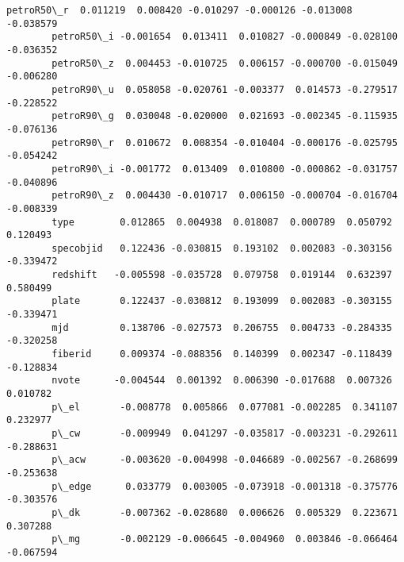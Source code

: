 \documentclass[11pt]{article}
\begin{document}
\begin{Verbatim}[commandchars=\\\{\}]
        petroR50\_r  0.011219  0.008420 -0.010297 -0.000126 -0.013008 -0.038579   
        petroR50\_i -0.001654  0.013411  0.010827 -0.000849 -0.028100 -0.036352   
        petroR50\_z  0.004453 -0.010725  0.006157 -0.000700 -0.015049 -0.006280   
        petroR90\_u  0.058058 -0.020761 -0.003377  0.014573 -0.279517 -0.228522   
        petroR90\_g  0.030048 -0.020000  0.021693 -0.002345 -0.115935 -0.076136   
        petroR90\_r  0.010672  0.008354 -0.010404 -0.000176 -0.025795 -0.054242   
        petroR90\_i -0.001772  0.013409  0.010800 -0.000862 -0.031757 -0.040896   
        petroR90\_z  0.004430 -0.010717  0.006150 -0.000704 -0.016704 -0.008339   
        type        0.012865  0.004938  0.018087  0.000789  0.050792  0.120493   
        specobjid   0.122436 -0.030815  0.193102  0.002083 -0.303156 -0.339472   
        redshift   -0.005598 -0.035728  0.079758  0.019144  0.632397  0.580499   
        plate       0.122437 -0.030812  0.193099  0.002083 -0.303155 -0.339471   
        mjd         0.138706 -0.027573  0.206755  0.004733 -0.284335 -0.320258   
        fiberid     0.009374 -0.088356  0.140399  0.002347 -0.118439 -0.128834   
        nvote      -0.004544  0.001392  0.006390 -0.017688  0.007326  0.010782   
        p\_el       -0.008778  0.005866  0.077081 -0.002285  0.341107  0.232977   
        p\_cw       -0.009949  0.041297 -0.035817 -0.003231 -0.292611 -0.288631   
        p\_acw      -0.003620 -0.004998 -0.046689 -0.002567 -0.268699 -0.253638   
        p\_edge      0.033779  0.003005 -0.073918 -0.001318 -0.375776 -0.303576   
        p\_dk       -0.007362 -0.028680  0.006626  0.005329  0.223671  0.307288   
        p\_mg       -0.002129 -0.006645 -0.004960  0.003846 -0.066464 -0.067594   
        

\end{Verbatim}
\end{document}
